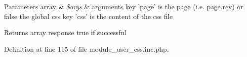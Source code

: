 \begin{DoxyParams}[1]{Parameters}
array & {\em \$args} & arguments key 'page' is the page (i.e. page.rev) or false the global css key 'css' is the content of the css file \\
\hline
\end{DoxyParams}
\begin{DoxyReturn}{Returns}
array response true if successful 
\end{DoxyReturn}


Definition at line 115 of file module\_\-user\_\-css.inc.php.

